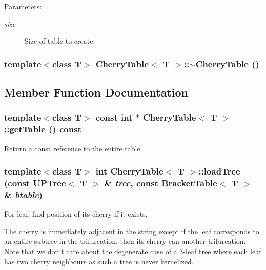 \begin{Desc}
\item[Parameters:]
\begin{description}
\item[{\em size}]Size of table to create. \end{description}
\end{Desc}
\subsubsection{\setlength{\rightskip}{0pt plus 5cm}template$<$class T$>$ {\bf Cherry\-Table}$<$ T $>$::$\sim${\bf Cherry\-Table} ()}\label{classCherryTable_a2}




\subsection{Member Function Documentation}
\subsubsection{\setlength{\rightskip}{0pt plus 5cm}template$<$class T$>$ const int $\ast$ {\bf Cherry\-Table}$<$ T $>$::get\-Table () const\hspace{0.3cm}{\tt  [inline]}}\label{classCherryTable_a5}


Return a const reference to the entire table. 

\subsubsection{\setlength{\rightskip}{0pt plus 5cm}template$<$class T$>$ int {\bf Cherry\-Table}$<$ T $>$::load\-Tree (const {\bf UPTree}$<$ T $>$ \& {\em tree}, const {\bf Bracket\-Table}$<$ T $>$ \& {\em btable})}\label{classCherryTable_a4}


For leaf, find position of its cherry if it exists. 

The cherry is immediately adjacent in the string except if the leaf corresponds to an entire subtree in the trifurcation, then its cherry can another trifurcation. Note that we don't care about the degenerate case of a 3-leaf tree where each leaf has two cherry neighbours as such a tree is never kernelized. 
